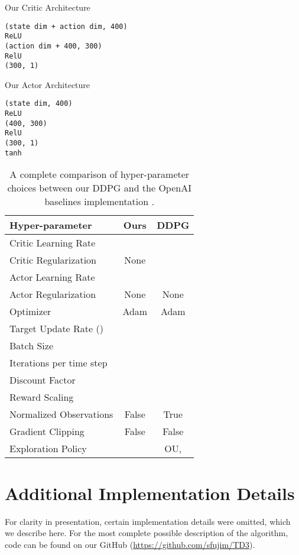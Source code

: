 \documentclass{article}
\begin{document}
Our Critic Architecture
\begin{verbatim}
(state dim + action dim, 400)
ReLU
(action dim + 400, 300)
RelU
(300, 1)
\end{verbatim}
Our Actor Architecture
\begin{verbatim}
(state dim, 400)
ReLU
(400, 300)
RelU
(300, 1)
tanh
\end{verbatim}

\begin{table}
\centering
\caption{A complete comparison of hyper-parameter choices between our DDPG and the OpenAI baselines implementation \cite{baselines}.}
\begin{center}
\begin{small}
\begin{tabular}{lcc}
\toprule
\bf{Hyper-parameter} & \bf{Ours} & \bf{DDPG} \\
\midrule
Critic Learning Rate &  &  \\
Critic Regularization & None &  \\
Actor Learning Rate &  &  \\
Actor Regularization & None & None \\
Optimizer & Adam & Adam \\
Target Update Rate () &  &  \\ 
Batch Size &  &  \\ 
Iterations per time step &  &  \\
Discount Factor &  &  \\
Reward Scaling &  &  \\
Normalized Observations & False & True \\
Gradient Clipping & False & False \\
Exploration Policy &  & OU,  \\ 
\bottomrule
\end{tabular}
\end{small}
\end{center}
\end{table}

\section{Additional Implementation Details}


For clarity in presentation, certain implementation details were omitted, which we describe here. For the most complete possible description of the algorithm, code can be found on our GitHub (\url{https://github.com/sfujim/TD3}). 
\end{document}
